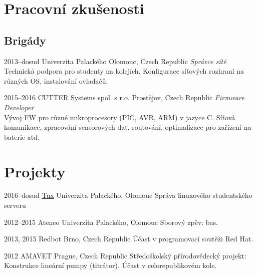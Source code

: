 \documentclass[]{friggeri-cv} %
\begin{document}

\section{Pracovní zkušenosti}
\subsection{Brigády}
\begin{entrylist}

\entry
{2013--dosud}
{Univerzita Palackého}
{Olomouc, Czech Republic}
{\emph{Správce sítě} \\
Technická podpora pro studenty na kolejích. Konfigurace síťových rozhraní na různých OS, instalování ovladačů.}

\entry
{2015--2016}
{CUTTER Systems spol. s r.o.}
{Prostějov, Czech Republic}
{\emph{Firmware Developer} \\
Vývoj FW pro různé mikroprocesory (PIC, AVR, ARM) v jazyce C. Síťová komunikace, zpracování sensorových dat, routování, optimalizace pro zařízení na baterie atd.}

\end{entrylist}

\section{Projekty}

\begin{entrylist}

\entry
{2016--dosud}
{\href{https://tux.inf.upol.cz}{Tux}}
{Univerzita Palackého, Olomouc}
{Správa linuxového studentského serveru}

\entry
{2012--2015}
{Ateneo}
{Univerzita Palackého, Olomouc}
{Sborový zpěv: bas.}

\entry
{2013, 2015}
{Redbot}
{Brno, Czech Republic}
{Účast v programovací soutěži Red Hat.}

\entry
{2012}
{AMAVET}
{Prague, Czech Republic}
{Středoškolský přírodovědecký projekt: Konstrukce lineární pumpy (titrátor). Účast v celorepublikovém kole.}

\end{entrylist}
\end{document}
